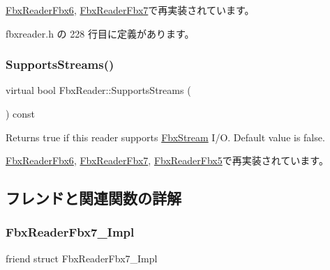 \hyperlink{class_fbx_reader_fbx6_a85827a96cd550f6260854858766e4d96}{Fbx\+Reader\+Fbx6}, \hyperlink{class_fbx_reader_fbx7_a513e9084df22767dfaf95252d815abbf}{Fbx\+Reader\+Fbx7}で再実装されています。



 fbxreader.\+h の 228 行目に定義があります。

\mbox{\label{class_fbx_reader_ab08a9e71a059ef6052e7fe2d8ba6c35d}} 
\subsubsection{\texorpdfstring{Supports\+Streams()}{SupportsStreams()}}
{\footnotesize\ttfamily virtual bool Fbx\+Reader\+::\+Supports\+Streams (\begin{DoxyParamCaption}{ }\end{DoxyParamCaption}) const\hspace{0.3cm}{\ttfamily [virtual]}}

Returns true if this reader supports \hyperlink{class_fbx_stream}{Fbx\+Stream} I/O. Default value is false. 

\hyperlink{class_fbx_reader_fbx6_ad38deb810e2c73562b9748486f4476bb}{Fbx\+Reader\+Fbx6}, \hyperlink{class_fbx_reader_fbx7_ab6283b540d9ea9141c9338400e1b8455}{Fbx\+Reader\+Fbx7}, \hyperlink{class_fbx_reader_fbx5_ae6f619a41303077d9d4ed2935f3d2108}{Fbx\+Reader\+Fbx5}で再実装されています。



\subsection{フレンドと関連関数の詳解}
\mbox{\label{class_fbx_reader_a825b5c450dc04c4042a16fa36d3641c3}} 
\subsubsection{\texorpdfstring{Fbx\+Reader\+Fbx7\+\_\+\+Impl}{FbxReaderFbx7\_Impl}}
{\footnotesize\ttfamily friend struct Fbx\+Reader\+Fbx7\+\_\+\+Impl\hspace{0.3cm}{\ttfamily [friend]}}



